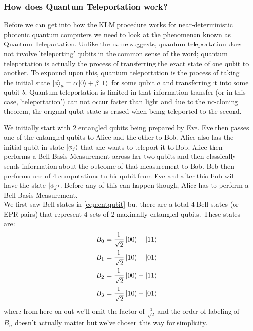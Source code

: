 \subsubsection{How does Quantum Teleportation work?}
Before we can get into how the KLM procedure works for near-deterministic photonic quantum computers we need to look at the phenomenon known as Quantum Teleportation. Unlike the name suggests, quantum teleportation does not involve 'teleporting' qubits in the common sense of the word; quantum teleportation is actually the process of transferring the exact state of one qubit to another. To expound upon this, quantum teleportation is the process of taking the initial state $\ket{\phi}_a = \alpha\ket{0} + \beta\ket{1}$ for some qubit \textit{a} and transferring it into some qubit \textit{b}. Quantum teleportation is limited in that information transfer (or in this case, 'teleportation') can not occur faster than light and due to the no-cloning theorem, the original qubit state is erased when being teleported to the second.
\par
We initially start with 2 entangled qubits being prepared by Eve. Eve then passes one of the entangled qubits to Alice and the other to Bob. Alice also has the initial qubit in state $\ket{\phi_j}$ that she wants to teleport it to Bob. Alice then performs a Bell Basis Measurement across her two qubits and then classically sends information about the outcome of that measurement to Bob. Bob then performs one of 4 computations to his qubit from Eve and after this Bob will have the state $\ket{\phi_j}$. Before any of this can happen though, Alice has to perform a Bell Basis Measurement. \\
We first saw Bell states in  \cref{eqn:entqubit} but there are a total 4 Bell states (or EPR pairs) that represent 4 sets of 2 maximally entangled qubits. These states are:
\begin{align}\label{eqn:Bell States}
    B_0 &= \frac{1}{\sqrt{2}}\ket{00} + \ket{11} \\
    B_1 &= \frac{1}{\sqrt{2}}\ket{10} + \ket{01} \\
    B_2 &= \frac{1}{\sqrt{2}}\ket{00} - \ket{11} \\
    B_3 &= \frac{1}{\sqrt{2}}\ket{10} - \ket{01} \\
\end{align}
where from here on out we'll omit the factor of $\frac{1}{\sqrt{2}}$ and the order of labeling of $B_n$ doesn't actually matter but we've chosen this way for simplicity. 
\par
